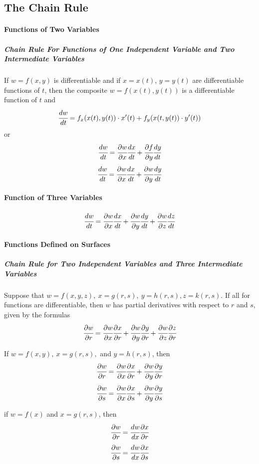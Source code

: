 \documentclass{article}
\begin{document}
        \subsection{The Chain Rule}
            \paragraph{Functions of Two Variables}
                \subparagraph{Chain Rule For Functions of One Independent Variable and Two Intermediate Variables} If $w=f(x,y)$ is differentiable and if $x=x(t)$, $y=y(t)$ are differentiable functions of $t$, then the composite $w=f(x(t),y(t))$ is a differentiable function of $t$ and
                \[\cfrac{dw}{dt}=f_x(x(t),y(t))\cdot x'(t)+f_y(x(t,y(t))\cdot y'(t))\]
                or
                \[\cfrac{dw}{dt}=\cfrac{\partial w}{\partial x}\cfrac{dx}{dt}+\cfrac{\partial f}{\partial y}\cfrac{dy}{dt}\]
                \newline
            \[\cfrac{dw}{dt}=\cfrac{\partial w}{\partial x}\cfrac{dx}{dt}+\cfrac{\partial w}{\partial y}\cfrac{dy}{dt}\]
            \paragraph{Function of Three Variables}
                \[\cfrac{dw}{dt}=\cfrac{\partial w}{\partial x}\cfrac{dx}{dt}+\cfrac{\partial w}{\partial y}\cfrac{dy}{dt}+\cfrac{\partial w}{\partial z}\cfrac{dz}{dt}\]
            \paragraph{Functions Defined on Surfaces}
                \subparagraph{Chain Rule for Two Independent Variables and Three Intermediate Variables} Suppose that $w=f(x,y,z),\ x=g(r,s),\ y=h(r,s), z=k(r,s)$. If all for functions are differentiable, then $w$ has partial derivatives with respect to $r$ and $s$, given by the formulas
                    \[\cfrac{\partial w}{\partial r}=\cfrac{\partial w}{\partial x}\cfrac{\partial x}{\partial r}+\cfrac{\partial w}{\partial y}\cfrac{\partial y}{\partial r}+\cfrac{\partial w}{\partial z}\cfrac{\partial z}{\partial r}\]
                \par If $w=f(x,y),\ x=g(r,s),$ and $y=h(r,s)$, then
                \[\cfrac{\partial w}{\partial r}=\cfrac{\partial w}{\partial x}\cfrac{\partial x}{\partial r}+\cfrac{\partial w}{\partial y}\cfrac{\partial y}{\partial r}\]
                \[\cfrac{\partial w}{\partial s}=\cfrac{\partial w}{\partial x}\cfrac{\partial x}{\partial s}+\cfrac{\partial w}{\partial y}\cfrac{\partial y}{\partial s}\]
                \par if $w=f(x)$ and $x=g(r,s)$, then
                \[\cfrac{\partial w}{\partial r}=\cfrac{dw}{dx}\cfrac{\partial x}{\partial r}\]
                \[\cfrac{\partial w}{\partial s}=\cfrac{dw}{dx}\cfrac{\partial x}{\partial s}\]
\end{document}
